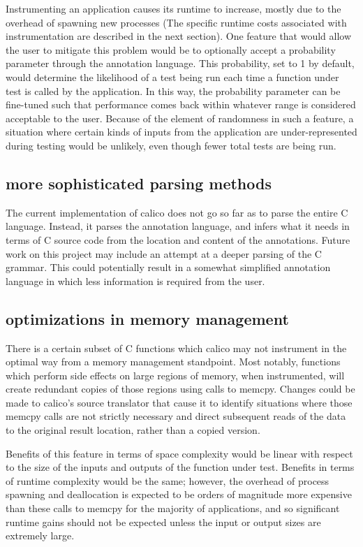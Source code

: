 \documentclass[notitlepage]{article}
\begin{document}
Instrumenting an application causes its runtime to increase, mostly due to the overhead of spawning new processes (The specific runtime costs associated with instrumentation are described in the next section). One feature that would allow the user to mitigate this problem would be to optionally accept a probability parameter through the annotation language. This probability, set to 1 by default, would determine the likelihood of a test being run each time a function under test is called by the application. In this way, the probability parameter can be fine-tuned such that performance comes back within whatever range is considered acceptable to the user. Because of the element of randomness in such a feature, a situation where certain kinds of inputs from the application are under-represented during testing would be unlikely, even though fewer total tests are being run.

\subsection{more sophisticated parsing methods}

The current implementation of calico does not go so far as to parse the entire C language. Instead, it parses the annotation language, and infers what it needs in terms of C source code from the location and content of the annotations. Future work on this project may include an attempt at a deeper parsing of the C grammar. This could potentially result in a somewhat simplified annotation language in which less information is required from the user.

\subsection{optimizations in memory management}

There is a certain subset of C functions which calico may not instrument in the optimal way from a memory management standpoint. Most notably, functions which perform side effects on large regions of memory, when instrumented, will create redundant copies of those regions using calls to memcpy. Changes could be made to calico's source translator that cause it to identify situations where those memcpy calls are not strictly necessary and direct subsequent reads of the data to the original result location, rather than a copied version.

Benefits of this feature in terms of space complexity would be linear with respect to the size of the inputs and outputs of the function under test. Benefits in terms of runtime complexity would be the same; however, the overhead of process spawning and deallocation is expected to be orders of magnitude more expensive than these calls to memcpy for the majority of applications, and so significant runtime gains should not be expected unless the input or output sizes are extremely large.
\end{document}
